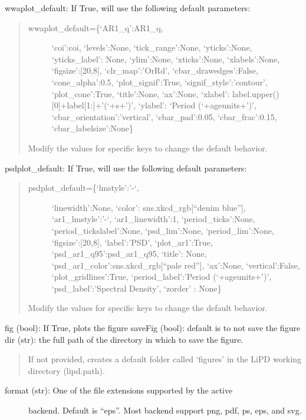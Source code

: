 \documentclass[letterpaper,10pt,english]{sphinxmanual}
\begin{document}
\begin{fulllineitems}
\begin{description}
wwaplot\_default: If True, will use the following default parameters:
\begin{quote}
\begin{description}
\item[{wwaplot\_default=\{‘AR1\_q’:AR1\_q,}] \leavevmode
‘coi’:coi,
‘levels’:None,
‘tick\_range’:None,
‘yticks’:None,
‘yticks\_label’: None,
‘ylim’:None,
‘xticks’:None,
‘xlabels’:None,
‘figsize’:{[}20,8{]},
‘clr\_map’:’OrRd’,
‘cbar\_drawedges’:False,
‘cone\_alpha’:0.5,
‘plot\_signif’:True,
‘signif\_style’:’contour’,
‘plot\_cone’:True,
‘title’:None,
‘ax’:None,
‘xlabel’: label.upper(){[}0{]}+label{[}1:{]}+’(‘+s+’)’,
‘ylabel’: ‘Period (‘+ageunits+’)’,
‘cbar\_orientation’:’vertical’,
‘cbar\_pad’:0.05,
‘cbar\_frac’:0.15,
‘cbar\_labelsize’:None\}

\end{description}

Modify the values for specific keys to change the default behavior.
\end{quote}

psdplot\_default: If True, will use the following default parameters:
\begin{quote}
\begin{description}
\item[{psdplot\_default=\{‘lmstyle’:’-‘,}] \leavevmode
‘linewidth’:None,
‘color’: sns.xkcd\_rgb{[}“denim blue”{]},
‘ar1\_lmstyle’:’-‘,
‘ar1\_linewidth’:1,
‘period\_ticks’:None,
‘period\_tickslabel’:None,
‘psd\_lim’:None,
‘period\_lim’:None,
‘figsize’:{[}20,8{]},
‘label’:’PSD’,
‘plot\_ar1’:True,
‘psd\_ar1\_q95’:psd\_ar1\_q95,
‘title’: None,
‘psd\_ar1\_color’:sns.xkcd\_rgb{[}“pale red”{]},
‘ax’:None,
‘vertical’:False,
‘plot\_gridlines’:True,
‘period\_label’:’Period (‘+ageunits+’)’,
‘psd\_label’:’Spectral Density’,
‘zorder’ : None\}

\end{description}

Modify the values for specific keys to change the default behavior.
\end{quote}

fig (bool): If True, plots the figure
saveFig (bool): default is to not save the figure
dir (str): the full path of the directory in which to save the figure.
\begin{quote}

If not provided, creates a default folder called ‘figures’ in the
LiPD working directory (lipd.path).
\end{quote}
\begin{description}
\item[{format (str): One of the file extensions supported by the active}] \leavevmode
backend. Default is “eps”. Most backend support png, pdf, ps, eps,
and svg.


\end{description}
\end{description}
\end{fulllineitems}
\end{document}
